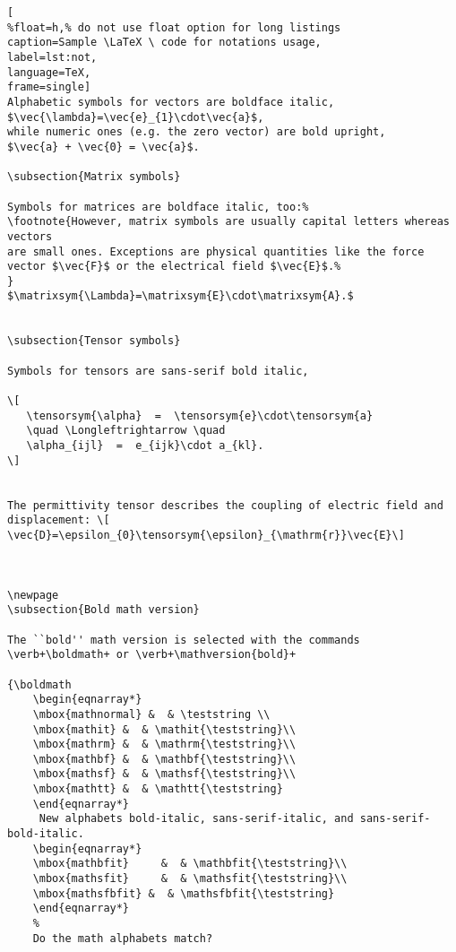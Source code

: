 \begin{lstlisting}[
%float=h,% do not use float option for long listings
caption=Sample \LaTeX \ code for notations usage, 
label=lst:not,
language=TeX,
frame=single]
Alphabetic symbols for vectors are boldface italic,
$\vec{\lambda}=\vec{e}_{1}\cdot\vec{a}$,
while numeric ones (e.g. the zero vector) are bold upright,
$\vec{a} + \vec{0} = \vec{a}$.

\subsection{Matrix symbols}

Symbols for matrices are boldface italic, too:%
\footnote{However, matrix symbols are usually capital letters whereas vectors
are small ones. Exceptions are physical quantities like the force
vector $\vec{F}$ or the electrical field $\vec{E}$.%
}
$\matrixsym{\Lambda}=\matrixsym{E}\cdot\matrixsym{A}.$


\subsection{Tensor symbols}

Symbols for tensors are sans-serif bold italic,

\[
   \tensorsym{\alpha}  =  \tensorsym{e}\cdot\tensorsym{a}
   \quad \Longleftrightarrow \quad
   \alpha_{ijl}  =  e_{ijk}\cdot a_{kl}.
\]


The permittivity tensor describes the coupling of electric field and
displacement: \[
\vec{D}=\epsilon_{0}\tensorsym{\epsilon}_{\mathrm{r}}\vec{E}\]



\newpage
\subsection{Bold math version}

The ``bold'' math version is selected with the commands
\verb+\boldmath+ or \verb+\mathversion{bold}+

{\boldmath
	\begin{eqnarray*}
	\mbox{mathnormal} &  & \teststring \\
	\mbox{mathit} &  & \mathit{\teststring}\\
	\mbox{mathrm} &  & \mathrm{\teststring}\\
	\mbox{mathbf} &  & \mathbf{\teststring}\\
	\mbox{mathsf} &  & \mathsf{\teststring}\\
	\mbox{mathtt} &  & \mathtt{\teststring}
	\end{eqnarray*}
	 New alphabets bold-italic, sans-serif-italic, and sans-serif-bold-italic.
	\begin{eqnarray*}
	\mbox{mathbfit}     &  & \mathbfit{\teststring}\\
	\mbox{mathsfit}     &  & \mathsfit{\teststring}\\
	\mbox{mathsfbfit} &  & \mathsfbfit{\teststring}
	\end{eqnarray*}
	%
	Do the math alphabets match?


\end{lstlisting}
